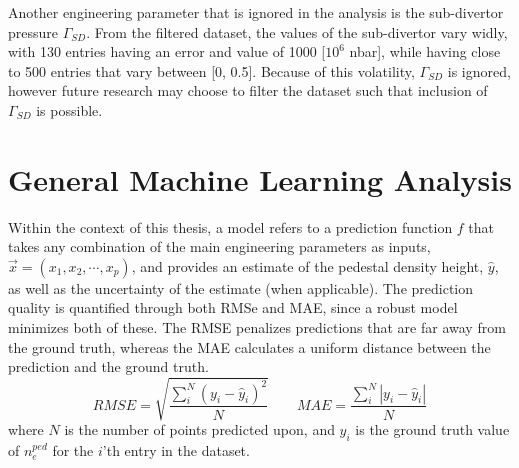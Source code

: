 \documentclass[a4paper, twoside, final, 12pt]{article}
\begin{document}
Another engineering parameter that is ignored in the analysis is the sub-divertor pressure $\Gamma_{SD}$.
From the filtered dataset, the values of the sub-divertor vary widly, with 130 entries having an error and value of 1000 [$10^6$ nbar], while having close to 500 entries that vary between [0, 0.5].
Because of this volatility, $\Gamma_{SD}$ is ignored, however future research may choose to filter the dataset such that inclusion of $\Gamma_{SD}$ is possible.



\section{General Machine Learning Analysis}\label{sec:principle-machine-learning-analysis}
Within the context of this thesis, a model refers to a prediction function $f$ that takes any combination of the main engineering parameters as inputs, $\vec{x} = (x_1, x_2, \cdots, x_p)$,  and provides an estimate of the pedestal density height, $\hat{y}$, as well as the uncertainty of the estimate (when applicable).
The prediction quality is quantified through both RMSe and MAE, since a robust model minimizes both of these.
The RMSE penalizes predictions that are far away from the ground truth, whereas the MAE calculates a uniform distance between the prediction and the ground truth.
\[RMSE = \sqrt{\frac{\sum_i^N \left( y_i - \hat{y}_i \right)^2}{N}} \quad\quad MAE = \frac{\sum_i^N |y_i -  \hat{y}_i |}{N}  \] 
where $N$ is the number of points predicted upon, and $y_i$ is the ground truth value of $n_e^{ped}$ for the $i$'th entry in the dataset. 
\end{document}
